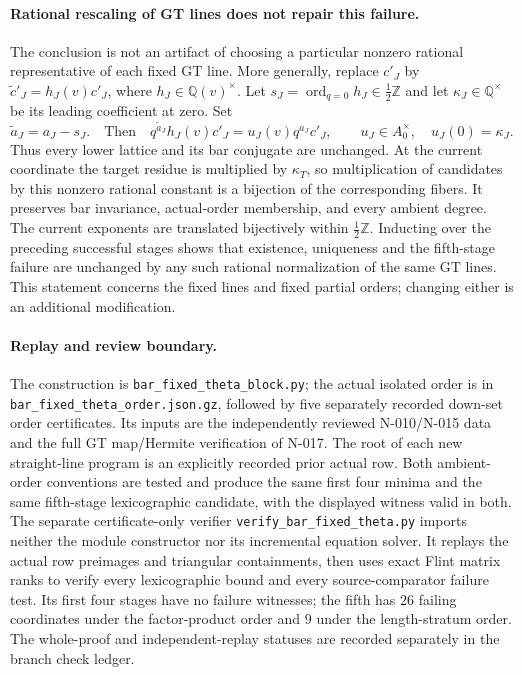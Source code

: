 \paragraph{Rational rescaling of GT lines does not repair this failure.}
The conclusion is not an artifact of choosing a particular nonzero
rational representative of each fixed GT line.  More generally,
replace $c'_J$ by $\widetilde c'_J=h_J(v)c'_J$, where
$h_J\in\mathbb Q(v)^\times$.  Let
$s_J=\operatorname{ord}_{q=0}h_J\in\tfrac12\mathbb Z$ and let
$\kappa_J\in\mathbb Q^\times$ be its leading coefficient at zero.
Set
\[
 \widetilde a_J=a_J-s_J.
 \quad\text{Then}\quad
 q^{\widetilde a_J}h_J(v)c'_J
     =u_J(v)q^{a_J}c'_J,
 \qquad u_J\in A_0^\times,\quad u_J(0)=\kappa_J.
 \tag{N-96}
\]
Thus every lower lattice and its bar conjugate are unchanged.
At the current coordinate the target residue is multiplied by
$\kappa_T$, so multiplication of candidates by this nonzero rational
constant is a bijection of the corresponding fibers.  It preserves
bar invariance, actual-order membership, and every ambient degree.
The current exponents are translated bijectively within
$\tfrac12\mathbb Z$.  Inducting over the preceding successful stages
shows that existence, uniqueness and the fifth-stage failure are
unchanged by any such rational normalization of the same GT lines.
This statement concerns the fixed lines and fixed partial orders;
changing either is an additional modification.

\paragraph{Replay and review boundary.}
The construction is
\nolinkurl{bar_fixed_theta_block.py}; the actual isolated order is in
\nolinkurl{bar_fixed_theta_order.json.gz}, followed by five separately
recorded down-set order certificates.  Its inputs are the independently
reviewed N-010/N-015 data and the full GT map/Hermite verification of
N-017.  The root of each new straight-line program is an explicitly
recorded prior actual row.  Both ambient-order conventions are tested
and produce the same first four minima and the same fifth-stage
lexicographic candidate, with the displayed witness valid in both.
The separate certificate-only verifier
\nolinkurl{verify_bar_fixed_theta.py} imports neither the module
constructor nor its incremental equation solver.  It replays the
actual row preimages and triangular containments, then uses exact
Flint matrix ranks to verify every lexicographic bound and every
source-comparator failure test.  Its first four stages have no
failure witnesses; the fifth has $26$ failing coordinates under the
factor-product order and $9$ under the length-stratum order.
The whole-proof and independent-replay statuses are recorded separately
in the branch check ledger.
